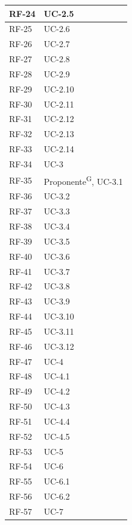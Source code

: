 \documentclass[8pt]{article}
\newcommand{\glossterm}[1]{#1\textsuperscript{G}} %
\begin{document}
\begin{longtable}{|>{\centering\arraybackslash}p{4cm}|>{\centering\arraybackslash}p{4cm}|}
            RF-24 & UC-2.5 \\ \hline
            RF-25 & UC-2.6 \\ \hline
            RF-26 & UC-2.7 \\ \hline
            RF-27 & UC-2.8 \\ \hline
            RF-28 & UC-2.9 \\ \hline
            RF-29 & UC-2.10 \\ \hline
            RF-30 & UC-2.11 \\ \hline
            RF-31 & UC-2.12 \\ \hline
            RF-32 & UC-2.13 \\ \hline
            RF-33 & UC-2.14 \\ \hline
            RF-34 & UC-3 \\ \hline
            RF-35 & \glossterm{Proponente}, UC-3.1 \\ \hline
            RF-36 & UC-3.2 \\ \hline
            RF-37 & UC-3.3 \\ \hline
            RF-38 & UC-3.4 \\ \hline
            RF-39 & UC-3.5 \\ \hline
            RF-40 & UC-3.6 \\ \hline
            RF-41 & UC-3.7 \\ \hline
            RF-42 & UC-3.8 \\ \hline
            RF-43 & UC-3.9 \\ \hline
            RF-44 & UC-3.10 \\ \hline
            RF-45 & UC-3.11 \\ \hline
            RF-46 & UC-3.12 \\ \hline
            RF-47 & UC-4 \\ \hline
            RF-48 & UC-4.1 \\ \hline
            RF-49 & UC-4.2 \\ \hline
            RF-50 & UC-4.3 \\ \hline
            RF-51 & UC-4.4 \\ \hline
            RF-52 & UC-4.5 \\ \hline
            RF-53 & UC-5 \\ \hline
            RF-54 & UC-6 \\ \hline
            RF-55 & UC-6.1 \\ \hline
            RF-56 & UC-6.2 \\ \hline
            RF-57 & UC-7 \\ \hline

\end{longtable}
\end{document}
